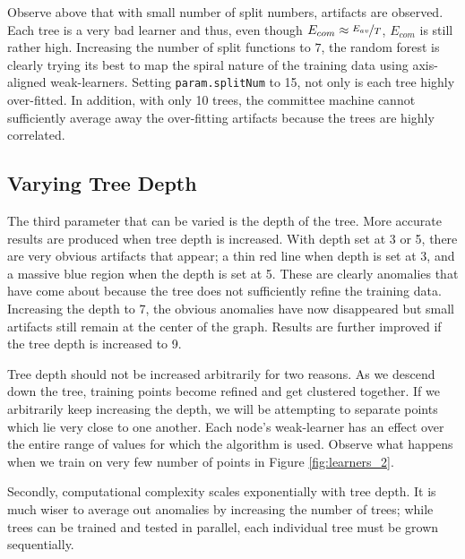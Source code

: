 \documentclass[a4paper,pra,twocolumn,10pt,aps,longbibliography,nobalancelastpage]{revtex4-1}
\begin{document}
Observe above that with small number of split numbers, artifacts are observed. Each tree is a very bad learner and thus, even though $E_{com}\approx\nicefrac{E_{av}}{T}$, $E_{com}$ is still rather high. Increasing the number of split functions to $7$, the random forest is clearly trying its best to map the spiral nature of the training data using axis-aligned weak-learners. Setting \texttt{param.splitNum} to 15, not only is each tree highly over-fitted. In addition, with only 10 trees, the committee machine cannot sufficiently average away the over-fitting artifacts because the trees are highly correlated.

\subsection{Varying Tree Depth}

The third parameter that can be varied is the depth of the tree. More accurate results are produced when tree depth is increased. With depth set at 3 or 5, there are very obvious artifacts that appear; a thin red line when depth is set at 3, and a massive blue region when the depth is set at 5. These are clearly anomalies that have come about because the tree does not sufficiently refine the training data. Increasing the depth to 7, the obvious anomalies have now disappeared but small artifacts still remain at the center of the graph. Results are further improved if the tree depth is increased to 9. 

Tree depth should not be increased arbitrarily for two reasons. As we descend down the tree, training points become refined and get clustered together. If we arbitrarily keep increasing the depth, we will be attempting to separate points which lie very close to one another. Each node's weak-learner has an effect over the entire range of values for which the algorithm is used. Observe what happens when we train on very few number of points in Figure \ref{fig:learners_2}.

Secondly, computational complexity scales exponentially with tree depth. It is much wiser to average out anomalies by increasing the number of trees; while trees can be trained and tested in parallel, each individual tree must be grown sequentially.
\end{document}
